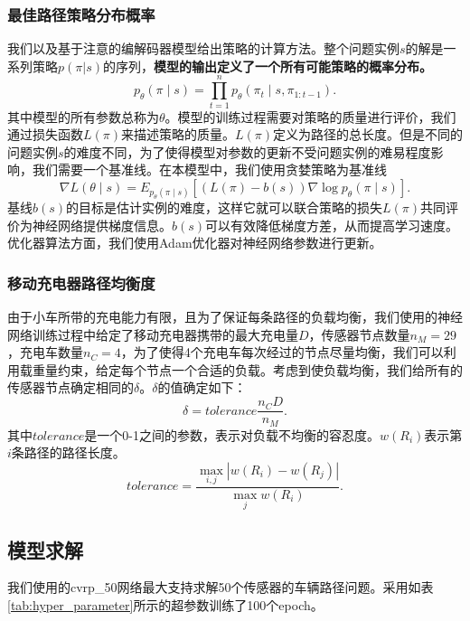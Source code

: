 \documentclass{whutmod}
\begin{document}
\subsubsection{最佳路径策略分布概率}
我们以及基于注意的编解码器模型给出策略的计算方法。整个问题实例$s$的解是一系列策略$p(\pi|s)$的序列，\textbf{模型的输出定义了一个所有可能策略的概率分布。}
\begin{equation}
	p_{\theta}(\pi \mid s)=\prod_{t=1}^{n} p_{ \theta }\left(\pi_{t} \mid s, \pi_{1: t-1}\right).
\end{equation}
其中模型的所有参数总称为$\theta$。模型的训练过程需要对策略的质量进行评价，我们通过损失函数$L(\pi)$来描述策略的质量。$L(\pi)$定义为路径的总长度。但是不同的问题实例$s$的难度不同，为了使得模型对参数的更新不受问题实例的难易程度影响，我们需要一个基准线。在本模型中，我们使用贪婪策略为基准线
\begin{equation}
	\nabla L ( \theta \mid s)= E _{p_{ \theta }( \pi \mid s)}\left[(L( \pi )-b(s)) \nabla \log p_{ \theta }(\pi \mid s)\right].
\end{equation}
基线$b(s)$的目标是估计实例的难度，这样它就可以联合策略的损失$L(\pi)$共同评价为神经网络提供梯度信息。$b(s)$可以有效降低梯度方差，从而提高学习速度。优化器算法方面，我们使用Adam优化器对神经网络参数进行更新。
\subsubsection{移动充电器路径均衡度}
由于小车所带的充电能力有限，且为了保证每条路径的负载均衡，我们使用的神经网络训练过程中给定了移动充电器携带的最大充电量$D$，传感器节点数量$n_M=29$，充电车数量$n_C=4$，为了使得4个充电车每次经过的节点尽量均衡，我们可以利用载重量约束，给定每个节点一个合适的负载。考虑到使负载均衡，我们给所有的传感器节点确定相同的$\delta$。$\delta$的值确定如下：
\begin{equation}
\delta = tolerance\frac{n_C D}{n_M}.
\end{equation}
其中$tolerance$是一个0-1之间的参数，表示对负载不均衡的容忍度。$w(R_i)$表示第$i$条路径的路径长度。
\begin{equation}
tolerance=\frac{\max_{i,j}|w(R_i)-w(R_j)|}{\max_{j} w(R_i)}.
\end{equation}


\subsection{模型求解}
我们使用的cvrp\_50网络最大支持求解50个传感器的车辆路径问题。采用如表\ref{tab:hyper_parameter}所示的超参数训练了100个epoch。
\end{document}

